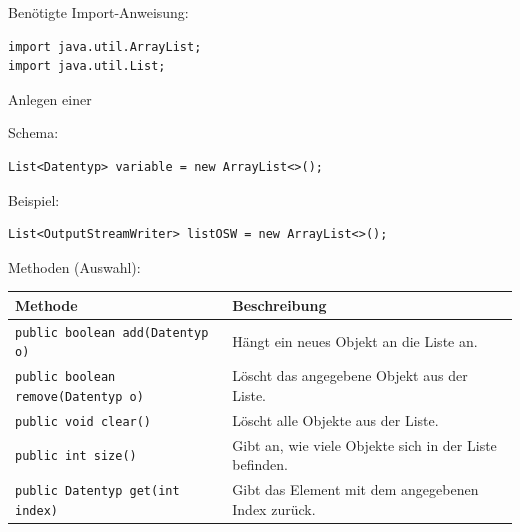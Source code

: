 Benötigte Import-Anweisung:

\begin{lstlisting}
import java.util.ArrayList;
import java.util.List;
\end{lstlisting}

Anlegen einer 

Schema:

\begin{lstlisting}
List<Datentyp> variable = new ArrayList<>();
\end{lstlisting}

Beispiel:

\begin{lstlisting}
List<OutputStreamWriter> listOSW = new ArrayList<>();
\end{lstlisting}

Methoden (Auswahl):

\bgroup
\def\arraystretch{1.2}
\begin{tabularx}{\textwidth}{|p{65mm}|X|}
\hline
\textbf{Methode} &
\textbf{Beschreibung}
\\ \hline
\texttt{public boolean add(Datentyp o)} &
Hängt ein neues Objekt an die Liste an.
\\ \hline
\texttt{public boolean remove(Datentyp o)} &
Löscht das angegebene Objekt aus der Liste.
\\ \hline
\texttt{public void clear()} &
Löscht alle Objekte aus der Liste.
\\ \hline
\texttt{public int size()} &
Gibt an, wie viele Objekte sich in der Liste befinden.
\\ \hline
\texttt{public Datentyp get(int index)} &
Gibt das Element mit dem angegebenen Index zurück.
\\ \hline
\end{tabularx}
\egroup